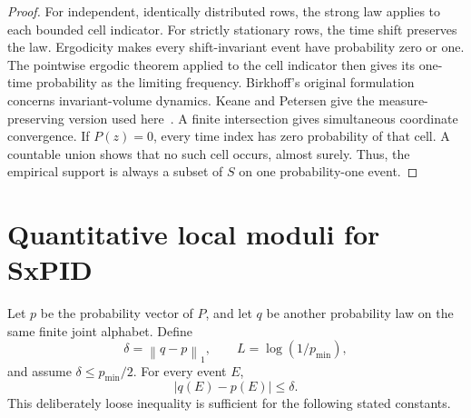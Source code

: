 \documentclass[11pt]{article}
\theoremstyle{definition}
\newcommand{\normone}[1]{\left\lVert #1\right\rVert_1}
\begin{document}
\begin{proof}
For independent, identically distributed rows, the strong law applies to each bounded cell
indicator. For strictly stationary rows, the time shift preserves the law. Ergodicity
makes every shift-invariant event have probability zero or one. The pointwise ergodic
theorem applied to the cell indicator then gives its one-time probability as the limiting
frequency. Birkhoff's original formulation concerns invariant-volume dynamics.
Keane and Petersen give the measure-preserving version used here~\cite{birkhoff1931,keanepetersen2006}. A finite
intersection gives simultaneous coordinate convergence.  If $P(z)=0$, every time index has zero
probability of that cell.  A countable union shows that no such cell occurs, almost surely.  Thus,
the empirical support is always a subset of $S$ on one probability-one event.
\end{proof}

\section{Quantitative local moduli for SxPID}

Let $p$ be the probability vector of $P$, and let $q$ be another probability law on the same finite
joint alphabet.  Define
\begin{equation}
  \delta=\normone{q-p},
  \qquad
  L=\log(1/p_{\min}),
\end{equation}
and assume $\delta\le p_{\min}/2$.  For every event $E$,
\begin{equation}\label{eq:event-loose}
  |q(E)-p(E)|\le\delta.
\end{equation}
This deliberately loose inequality is sufficient for the following stated constants.
\end{document}

